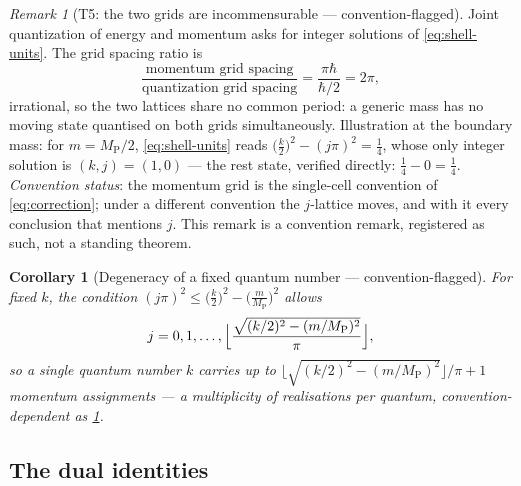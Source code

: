 \documentclass[11pt]{amsbook}
\theoremstyle{plain}
\newtheorem{corollary}[theorem]{Corollary}
\theoremstyle{definition}
\theoremstyle{remark}
\newtheorem{remark}[theorem]{Remark}
\newcommand{\uses}[1]{\par\nopagebreak\noindent{\footnotesize\emph{Uses: #1.}\par}}
\begin{document}
\begin{remark}[T5: the two grids are incommensurable --- convention-flagged]\label{rem:t5}
Joint quantization of energy and momentum asks for integer solutions of \cref{eq:shell-units}. The grid spacing ratio is
\begin{equation}\label{eq:incommensurate}
\frac{\text{momentum grid spacing}}{\text{quantization grid spacing}} = \frac{\pi\hbar}{\hbar/2} = 2\pi,
\end{equation}
irrational, so the two lattices share no common period: a generic mass has no moving state quantised on both grids simultaneously. Illustration at the boundary mass: for $m = M_{\mathrm P}/2$, \cref{eq:shell-units} reads $\bigl(\tfrac{k}{2}\bigr)^{2} - (j\pi)^{2} = \tfrac14$, whose only integer solution is $(k, j) = (1, 0)$ --- the rest state, verified directly: $\tfrac14 - 0 = \tfrac14$. \emph{Convention status}: the momentum grid is the single-cell convention of \cref{eq:correction}; under a different convention the $j$-lattice moves, and with it every conclusion that mentions $j$. This remark is a convention remark, registered as such, not a standing theorem.
\end{remark}

\begin{corollary}[Degeneracy of a fixed quantum number --- convention-flagged]\label{cor:degeneracy}
For fixed $k$, the condition $(j\pi)^{2} \leq \bigl(\tfrac{k}{2}\bigr)^{2} - \bigl(\tfrac{m}{M_{\mathrm P}}\bigr)^{2}$ allows
\begin{equation}\label{eq:degeneracy}
j = 0, 1, \ldots, \Bigl\lfloor \frac{\sqrt{(k/2)^{2} - (m/M_{\mathrm P})^{2}}}{\pi} \Bigr\rfloor,
\end{equation}
so a single quantum number $k$ carries up to $\bigl\lfloor\sqrt{(k/2)^{2} - (m/M_{\mathrm P})^{2}}\bigr\rfloor/\pi + 1$ momentum assignments --- a multiplicity of realisations per quantum, convention-dependent as \cref{rem:t5}.
\uses{\cref{eq:shell-units}}
\end{corollary}

\subsection{The dual identities}\label{sec:dual-identities}
\end{document}
